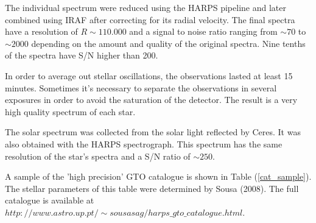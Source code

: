 \documentclass[dvips,12pt,a4paper]{report}
\begin{document}
{The individual spectrum were reduced using the HARPS pipeline and later combined using IRAF after correcting for its radial velocity. The final spectra have a resolution of $R\sim110.000$ and a signal to noise ratio ranging from $\sim70$ to $\sim2000$ depending on the amount and quality of the original spectra. Nine tenths of the spectra have S/N higher than 200.  

In order to average out stellar oscillations, the observations lasted at least 15 minutes. Sometimes it's necessary to separate the observations in several exposures in order to avoid the saturation of the detector. The result is a very high quality spectrum of each star. 

The solar spectrum was collected from the solar light reflected by Ceres. It was also obtained with the HARPS spectrograph. This spectrum has the same resolution of the star's spectra and a S/N ratio of $\sim250$. 

A sample of the 'high precision' GTO catalogue is shown in Table (\ref{cat_sample}). The stellar parameters of this table were determined by Sousa (2008). The full catalogue is available at $http://www.astro.up.pt/\sim sousasag/harps\_gto\_catalogue.html$. 

}
\end{document}
